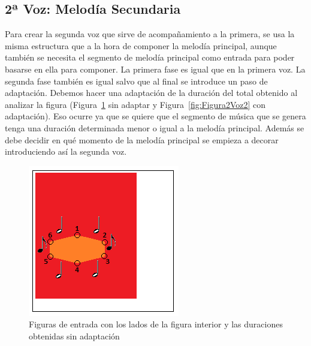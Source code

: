 
\subsection{2ª Voz: Melodía Secundaria}

Para crear la segunda voz que sirve de acompañamiento a la primera, se usa la misma estructura que a la hora de componer la melodía principal, aunque también se necesita el segmento de melodía principal como entrada para poder basarse en ella para componer. 
La primera fase es igual que en la primera voz. La segunda fase también es igual salvo que al final se introduce un paso de adaptación. Debemos hacer una adaptación de la duración del total obtenido al analizar la figura (Figura~\ref{fig:Figura1Voz2} sin adaptar y Figura~\ref{fig:Figura2Voz2} con adaptación). Eso ocurre ya que se quiere que el segmento de música que se genera tenga una duración determinada menor o igual a la melodía principal. Además se debe decidir en qué momento de la melodía principal se empieza a decorar introduciendo así la segunda voz.

 		\begin{figure}[htbp]
		\centering
		\hspace*{0.0in}
		\includegraphics[scale=1]{graphics/simpletest4-F2.png}
		\caption{Figuras de entrada con los lados de la figura interior y las duraciones obtenidas sin adaptación}
		\label{fig:Figura1Voz2}
		\end{figure}

